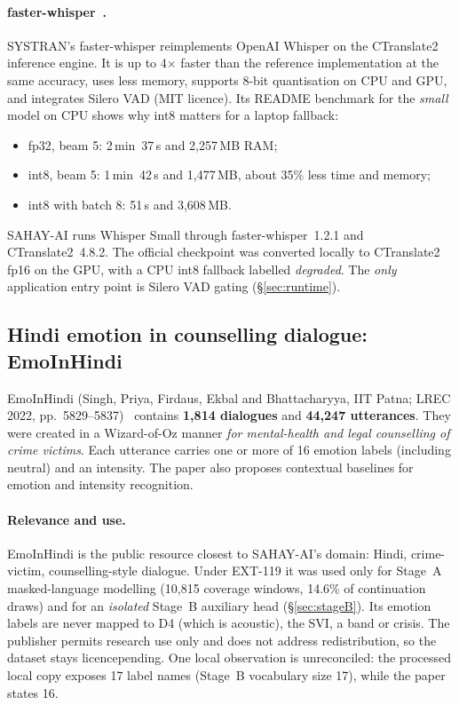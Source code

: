 \documentclass[11pt,a4paper]{article}
\newcommand{\codeus}{\textunderscore\allowbreak}
\DeclareRobustCommand{\code}[1]{{\ttfamily\let\_\codeus #1}}
\begin{document}
\paragraph{faster-whisper~\cite{systran}.} SYSTRAN's faster-whisper reimplements OpenAI Whisper on
the CTranslate2 inference engine. It is up to 4$\times$ faster than the reference implementation at
the same accuracy, uses less memory, supports 8-bit quantisation on CPU and GPU, and integrates
Silero VAD (MIT licence). Its README benchmark for the \emph{small} model on CPU shows why int8
matters for a laptop fallback:
\begin{itemize}
  \item fp32, beam 5: 2\,min~37\,s and 2{,}257\,MB RAM;
  \item int8, beam 5: 1\,min~42\,s and 1{,}477\,MB, about 35\% less time and memory;
  \item int8 with batch 8: 51\,s and 3{,}608\,MB.
\end{itemize}
SAHAY-AI runs Whisper Small through faster-whisper~1.2.1 and CTranslate2~4.8.2. The official
checkpoint was converted locally to CTranslate2 fp16 on the GPU, with a CPU int8 fallback labelled
\emph{degraded}. The \emph{only} application entry point is Silero VAD gating (\S\ref{sec:runtime}).

\subsection{Hindi emotion in counselling dialogue: EmoInHindi}
EmoInHindi (Singh, Priya, Firdaus, Ekbal and Bhattacharyya, IIT Patna; LREC 2022,
pp.~5829--5837)~\cite{singh2022} contains \textbf{1{,}814 dialogues} and \textbf{44{,}247 utterances}. They were created in a
Wizard-of-Oz manner \emph{for mental-health and legal counselling of crime victims}. Each utterance
carries one or more of 16 emotion labels (including neutral) and an intensity. The paper also
proposes contextual baselines for emotion and intensity recognition.

\paragraph{Relevance and use.} EmoInHindi is the public resource closest to SAHAY-AI's domain:
Hindi, crime-victim, counselling-style dialogue. Under EXT-119 it was used only for Stage~A
masked-language modelling (10{,}815 coverage windows, 14.6\% of continuation draws) and for an
\emph{isolated} Stage~B auxiliary head (\S\ref{sec:stageB}). Its emotion labels are never mapped to
D4 (which is acoustic), the SVI, a band or crisis. The publisher permits research use only and does
not address redistribution, so the dataset stays \code{licence\_pending}. One local observation is
unreconciled: the processed local copy exposes 17 label names (Stage~B vocabulary size 17), while
the paper states 16.
\end{document}
